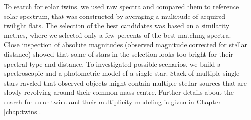 To search for solar twins, we used raw spectra and compared them to reference solar spectrum, that was constructed by averaging a multitude of acquired twilight flats. The selection of the best candidates was based on a similarity metrics, where we selected only a few percents of the best matching spectra. Close inspection of absolute magnitudes (observed magnitude corrected for stellar distance) showed that some of stars in the selection looks too bright for their spectral type and distance. To investigated possible scenarios, we build a spectroscopic and a photometric model of a single star. Stack of multiple single stars raveled that observed objects might contain multiple stellar sources that are slowly revolving around their common mass centre. Further details about the search for solar twins and their multiplicity modeling is given in Chapter \ref{chap:twins}.